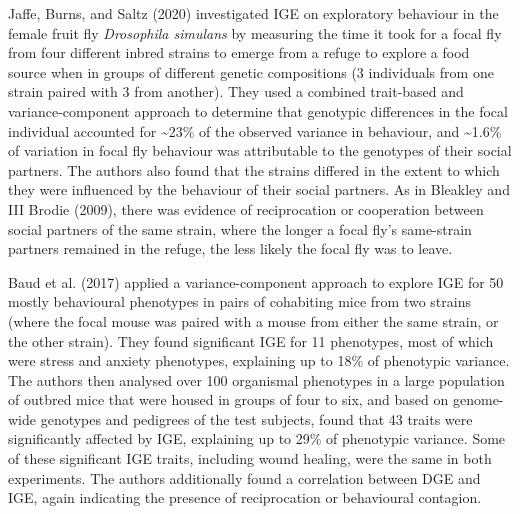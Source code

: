 \documentclass[
]{book}
\begin{document}
Jaffe, Burns, and Saltz (2020) investigated IGE on exploratory behaviour in the female fruit fly \emph{Drosophila simulans} by measuring the time it took for a focal fly from four different inbred strains to emerge from a refuge to explore a food source when in groups of different genetic compositions (3 individuals from one strain paired with 3 from another). They used a combined trait-based and variance-component approach to determine that genotypic differences in the focal individual accounted for \textasciitilde23\% of the observed variance in behaviour, and \textasciitilde1.6\% of variation in focal fly behaviour was attributable to the genotypes of their social partners. The authors also found that the strains differed in the extent to which they were influenced by the behaviour of their social partners. As in Bleakley and III Brodie (2009), there was evidence of reciprocation or cooperation between social partners of the same strain, where the longer a focal fly's same-strain partners remained in the refuge, the less likely the focal fly was to leave.

Baud et al. (2017) applied a variance-component approach to explore IGE for 50 mostly behavioural phenotypes in pairs of cohabiting mice from two strains (where the focal mouse was paired with a mouse from either the same strain, or the other strain). They found significant IGE for 11 phenotypes, most of which were stress and anxiety phenotypes, explaining up to 18\% of phenotypic variance. The authors then analysed over 100 organismal phenotypes in a large population of outbred mice that were housed in groups of four to six, and based on genome-wide genotypes and pedigrees of the test subjects, found that 43 traits were significantly affected by IGE, explaining up to 29\% of phenotypic variance. Some of these significant IGE traits, including wound healing, were the same in both experiments. The authors additionally found a correlation between DGE and IGE, again indicating the presence of reciprocation or behavioural contagion.
\end{document}
